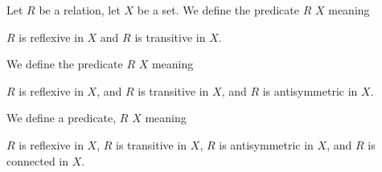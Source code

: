 \documentclass{article}
\begin{document}
\begin{definition}
Let $R$ be a relation, let $X$ be a set.
We define the predicate $R$  $X$ meaning
\begin{defn}
\item $R$ is reflexive in $X$ and $R$ is transitive in $X$.
\end{defn}
We define the predicate $R$  $X$ meaning
\begin{defn}
\item $R$ is reflexive in $X$, and $R$ is transitive in $X$, and $R$ is
  antisymmetric in $X$.
\end{defn}
We define a predicate, $R$  $X$ meaning
\begin{defn}
\item $R$ is reflexive in $X$, $R$ is transitive in $X$, $R$ is
  antisymmetric in $X$, and $R$ is connected in $X$.
\end{defn}
\end{definition}
\end{document}
